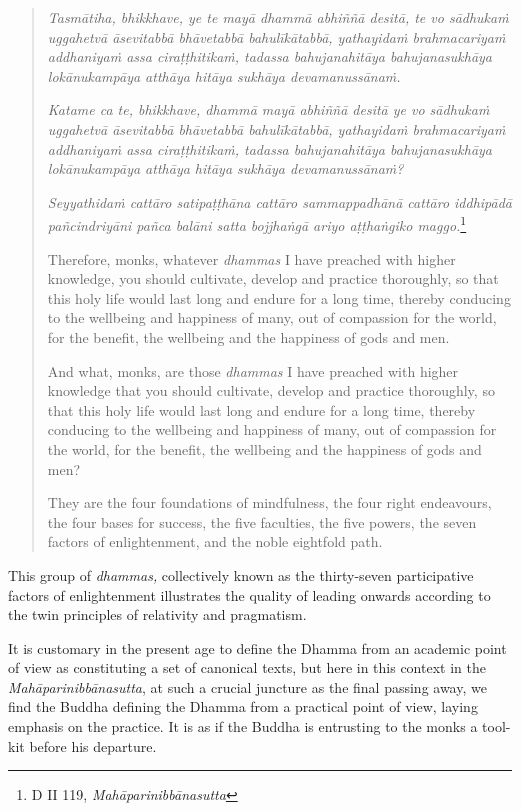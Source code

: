 \begin{quote}
\emph{Tasmātiha, bhikkhave, ye te mayā dhammā abhiññā desitā, te vo sādhukaṁ uggahetvā āsevitabbā bhāvetabbā bahulīkātabbā, yathayidaṁ brahmacariyaṁ addhaniyaṁ assa ciraṭṭhitikaṁ, tadassa bahujanahitāya bahujanasukhāya lokānukampāya atthāya hitāya sukhāya devamanussānaṁ.}

\emph{Katame ca te, bhikkhave, dhammā mayā abhiññā desitā ye vo sādhukaṁ uggahetvā āsevitabbā bhāvetabbā bahulīkātabbā, yathayidaṁ brahmacariyaṁ addhaniyaṁ assa ciraṭṭhitikaṁ, tadassa bahujanahitāya bahujanasukhāya lokānukampāya atthāya hitāya sukhāya devamanussānaṁ?}

\emph{Seyyathidaṁ cattāro satipaṭṭhāna cattāro sammappadhānā cattāro iddhipādā pañcindriyāni pañca balāni satta bojjhaṅgā ariyo aṭṭhaṅgiko maggo.}\footnote{D II 119, \emph{Mahāparinibbānasutta}}

Therefore, monks, whatever \emph{dhammas} I have preached with higher knowledge, you should cultivate, develop and practice thoroughly, so that this holy life would last long and endure for a long time, thereby conducing to the wellbeing and happiness of many, out of compassion for the world, for the benefit, the wellbeing and the happiness of gods and men.

And what, monks, are those \emph{dhammas} I have preached with higher knowledge that you should cultivate, develop and practice thoroughly, so that this holy life would last long and endure for a long time, thereby conducing to the wellbeing and happiness of many, out of compassion for the world, for the benefit, the wellbeing and the happiness of gods and men?

They are the four foundations of mindfulness, the four right endeavours, the four bases for success, the five faculties, the five powers, the seven factors of enlightenment, and the noble eightfold path.
\end{quote}

This group of \emph{dhammas,} collectively known as the thirty-seven participative factors of enlightenment illustrates the quality of leading onwards according to the twin principles of relativity and pragmatism.

It is customary in the present age to define the Dhamma from an academic point of view as constituting a set of canonical texts, but here in this context in the \emph{Mahāparinibbānasutta}, at such a crucial juncture as the final passing away, we find the Buddha defining the Dhamma from a practical point of view, laying emphasis on the practice. It is as if the Buddha is entrusting to the monks a tool-kit before his departure.

